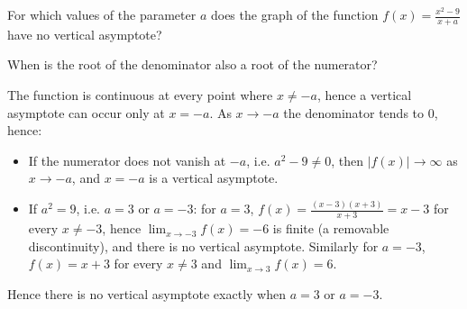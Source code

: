 
\begin{question}
For which values of the parameter $a$ does the graph of the function $f(x)=\frac{x^2-9}{x+a}$ have no vertical asymptote?
\end{question}

\begin{hint}
When is the root of the denominator also a root of the numerator?
\end{hint}

\begin{solution}
The function is continuous at every point where $x\neq -a$, hence a vertical asymptote can occur only at $x=-a$. As $x\to-a$ the denominator tends to $0$, hence:
\begin{itemize}
  \item If the numerator does not vanish at $-a$, i.e. $a^2-9\neq0$, then $|f(x)|\to\infty$ as $x\to-a$, and $x=-a$ is a vertical asymptote.
  \item If $a^2=9$, i.e. $a=3$ or $a=-3$: for $a=3$, $f(x)=\frac{(x-3)(x+3)}{x+3}=x-3$ for every $x\neq-3$, hence $\lim_{x\to-3}f(x)=-6$ is finite (a removable discontinuity), and there is no vertical asymptote. Similarly for $a=-3$, $f(x)=x+3$ for every $x\neq3$ and $\lim_{x\to3}f(x)=6$.
\end{itemize}
Hence there is no vertical asymptote exactly when $\boxed{a=3 \text{ or } a=-3}$.
\end{solution}
